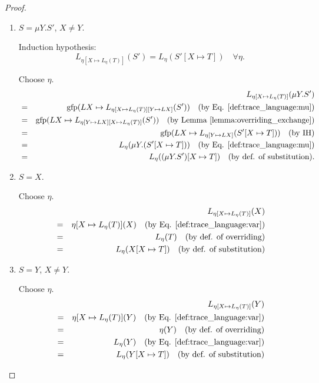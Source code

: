 \documentclass{llncs}
\newcommand*{\gfp}{\mathrm{gfp}}
\renewcommand*{\|}{\;|\;}
\begin{document}
\begin{proof}
\begin{enumerate}
    \item
      \label{case:substitution_trace_language:mu2}
      $S = \mu Y.S'$, $X \neq Y$.

      Induction hypothesis:
      \begin{equation*}
        L_{\eta[X \mapsto L_\eta(T)]}(S') = L_\eta(S'[X \mapsto T]) \quad \forall \eta.
      \end{equation*}

      Choose $\eta$.
      \begin{eqnarray*}
        &&  L_{\eta[X \mapsto L_\eta(T)]}(\mu Y.S') \\
        &=& \gfp(LX \mapsto L_{\eta[X \mapsto L_\eta(T)][Y \mapsto LX]}(S'))
            \quad \text{(by Eq. \ref{def:trace_language:mu})} \\
        &=& \gfp(LX \mapsto L_{\eta[Y \mapsto LX][X \mapsto L_\eta(T)]}(S'))
            \quad \text{(by Lemma \ref{lemma:overriding_exchange})} \\
        &=& \gfp(LX \mapsto L_{\eta[Y \mapsto LX]}(S'[X \mapsto T]))
            \quad \text{(by IH)} \\
        &=& L_\eta(\mu Y.(S'[X \mapsto T]))
            \quad \text{(by Eq. \ref{def:trace_language:mu})} \\
        &=& L_\eta((\mu Y.S')[X \mapsto T])
            \quad \text{(by def. of substitution)}. \\
      \end{eqnarray*}

    \item
      \label{case:substitution_trace_language:var1}
      $S = X$.

      Choose $\eta$.
      \begin{eqnarray*}
        &&  L_{\eta[X \mapsto L_\eta(T)]}(X) \\
        &=& \eta[X \mapsto L_\eta(T)](X)
            \quad \text{(by Eq. \ref{def:trace_language:var})} \\
        &=& L_\eta(T)
            \quad \text{(by def. of overriding)} \\
        &=& L_\eta(X[X \mapsto T])
            \quad \text{(by def. of substitution)}
      \end{eqnarray*}

    \item
      \label{case:substitution_trace_language:var2}
      $S = Y$, $X \neq Y$.

      Choose $\eta$.
      \begin{eqnarray*}
        &&  L_{\eta[X \mapsto L_\eta(T)]}(Y) \\
        &=& \eta[X \mapsto L_\eta(T)](Y)
            \quad \text{(by Eq. \ref{def:trace_language:var})} \\
        &=& \eta(Y)
            \quad \text{(by def. of overriding)} \\
        &=& L_\eta(Y)
            \quad \text{(by Eq. \ref{def:trace_language:var})} \\
        &=& L_\eta(Y[X \mapsto T])
            \quad \text{(by def. of substitution)}
      \end{eqnarray*}


\end{enumerate}
\end{proof}
\end{document}
